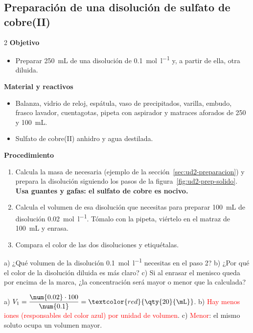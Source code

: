 \subsection{Preparación de una disolución de sulfato de cobre(II)}

\begin{multicols}{2}
    \textbf{Objetivo}
    \begin{itemize}
        \item Preparar \qty{250}{\mL} de una disolución de  \qty{0.1}{\mol\per\litre} y, a partir de ella, otra diluida.
    \end{itemize}
    \columnbreak
    \textbf{Material y reactivos}
    \begin{itemize}
        \item Balanza, vidrio de reloj, espátula, vaso de precipitados, varilla, embudo, frasco lavador, cuentagotas, pipeta
        con aspirador y matraces aforados de 250 y \qty{100}{\mL}.
        \item Sulfato de cobre(II) anhidro y agua destilada.
    \end{itemize}
\end{multicols}

\textbf{Procedimiento}
\begin{enumerate}[label=\numberballgreen]
    \item Calcula la masa de  necesaria (ejemplo de la sección~\ref{sec:ud2-preparacion}) y prepara la disolución siguiendo
    los pasos de la figura~\ref{fig:ud2-prep-solido}. \textbf{Usa guantes y gafas: el sulfato de cobre es nocivo.}
    \item Calcula el volumen de esa disolución que necesitas para preparar \qty{100}{\mL} de disolución
    \qty{0.02}{\mol\per\litre}. Tómalo con la pipeta, viértelo en el matraz de \qty{100}{\mL} y enrasa.
    \item Compara el color de las dos disoluciones y etiquétalas.
\end{enumerate}

\begin{exercise}
    a) ¿Qué volumen de la disolución \qty{0.1}{\mol\per\litre} necesitas en el paso 2? b) ¿Por qué el color de la disolución
    diluida es más claro? c) Si al enrasar el menisco queda por encima de la marca, ¿la concentración será mayor o menor que la
    calculada?
    \begin{solu}
        a) \(V_1 = \dfrac{\num{0.02} \cdot 100}{\num{0.1}} = \textcolor{red}{\qty{20}{\mL}}\). b) \textcolor{red}{Hay menos iones
         (responsables del color azul) por unidad de volumen}. c) \textcolor{red}{Menor}: el mismo soluto ocupa un volumen
        mayor.
    \end{solu}
\end{exercise}

